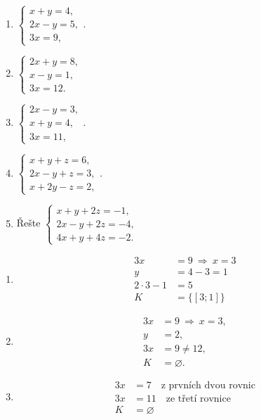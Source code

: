 \documentclass[11pt,a4paper]{article}
\begin{document}
\begin{zadaniReseniBox}[title={Domácí úkol}]
\begin{enumerate}[label=\alph*)]
\item $\begin{cases}x+y=4,\\2x-y=5,\\3x=9,\end{cases}$.
\item $\begin{cases}2x+y=8,\\x-y=1,\\3x=12.\end{cases}$
\item $\begin{cases}2x-y=3,\\x+y=4,\\3x=11,\end{cases}$.
\item $\begin{cases}x+y+z=6,\\2x-y+z=3,\\x+2y-z=2,\end{cases}$.
\item Řešte $\begin{cases}x+y+2z=-1,\\2x-y+2z=-4,\\4x+y+4z=-2.\end{cases}$
\end{enumerate}
\tcblower
\begin{enumerate}[label=\alph*)]
\item
\[\begin{aligned}
3x&=9\ \Rightarrow\ x=3\\y&=4-3=1\\2\cdot3-1&=5\\K&=\{[3;1]\}
\end{aligned}\]

\item
\[\begin{aligned}
3x&=9\ \Rightarrow\ x=3,\\
y&=2,\\
3x&=9\ne12,\\
K&=\varnothing.
\end{aligned}\]

\item
\[\begin{aligned}
3x&=7\quad\text{z prvních dvou rovnic}\\3x&=11\quad\text{ze třetí rovnice}\\K&=\varnothing
\end{aligned}\]


\end{enumerate}
\end{zadaniReseniBox}
\end{document}
